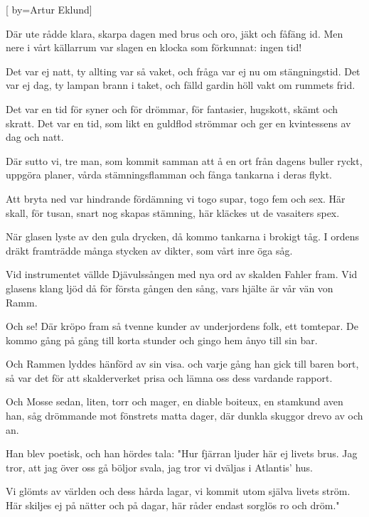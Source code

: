
[
	by={Artur Eklund}]

\beginverse*
Där ute rådde klara, skarpa dagen
med brus och oro, jäkt och fåfäng id.
Men nere i vårt källarrum var slagen
en klocka som förkunnat: ingen tid!
\endverse

\beginverse*
Det var ej natt, ty allting var så vaket,
och fråga var ej nu om stängningstid.
Det var ej dag, ty lampan brann i taket,
och fälld gardin höll vakt om rummets frid.
\endverse

\beginverse*
Det var en tid för syner och för drömmar,
för fantasier, hugskott, skämt och skratt.
Det var en tid, som likt en guldflod strömmar
och ger en kvintessens av dag och natt.
\endverse

\beginverse*
Där sutto vi, tre man, som kommit samman
att å en ort från dagens buller ryckt,
uppgöra planer, vårda stämningsflamman
och fånga tankarna i deras flykt.
\endverse

\beginverse*
Att bryta ned var hindrande fördämning
vi togo supar, togo fem och sex.
Här skall, för tusan, snart nog skapas stämning,
här kläckes ut de vasaiters spex.
\endverse

\beginverse*
När glasen lyste av den gula drycken,
då kommo tankarna i brokigt tåg.
I ordens dräkt framträdde många stycken
av dikter, som vårt inre öga såg.
\endverse

\newpage
\beginverse*
Vid instrumentet vällde Djävulssången
med nya ord av skalden Fahler fram.
Vid glasens klang ljöd då för första gången
den sång, vars hjälte är vår vän von Ramm.
\endverse

\beginverse*
Och se! Där kröpo fram så tvenne kunder
av underjordens folk, ett tomtepar.
De kommo gång på gång till korta stunder
och gingo hem ånyo till sin bar.
\endverse

\beginverse*
Och Rammen lyddes hänförd av sin visa.
och varje gång han gick till baren bort,
så var det för att skalderverket prisa
och lämna oss dess vardande rapport.
\endverse

\beginverse*
Och Mosse sedan, liten, torr och mager,
en diable boiteux, en stamkund aven han,
såg drömmande mot fönstrets matta dager,
där dunkla skuggor drevo av och an.
\endverse

\beginverse*
Han blev poetisk, och han hördes tala:
"Hur fjärran ljuder här ej livets brus.
Jag tror, att jag över oss gå böljor svala,
jag tror vi dväljas i Atlantis' hus.
\endverse

\beginverse*
Vi glömts av världen och dess hårda lagar,
vi kommit utom själva livets ström.
Här skiljes ej på nätter och på dagar,
här råder endast sorglös ro och dröm."
\endverse

